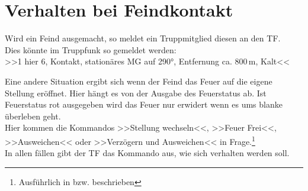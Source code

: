 \pagebreak
\section{Verhalten bei Feindkontakt}
Wird ein Feind ausgemacht, so meldet ein Truppmitglied diesen an den TF.\\

Dies könnte im Truppfunk so gemeldet werden:\\
>>1 hier 6, Kontakt, stationäres MG auf 290°, Entfernung ca. 800\,m, Kalt<<

Eine andere Situation ergibt sich wenn der Feind das Feuer auf die eigene Stellung eröffnet. Hier hängt es von der Ausgabe des Feuerstatus ab. Ist Feuerstatus rot ausgegeben wird das Feuer nur erwidert wenn es ums blanke überleben geht.\\

Hier kommen die Kommandos >>Stellung wechseln<<, >>Feuer Frei<<, >>Ausweichen<< oder >>Verzögern und Ausweichen<< in Frage.\footnote{Ausführlich in  bzw.  beschrieben}\\

In allen fällen gibt der TF das Kommando aus, wie sich verhalten werden soll.